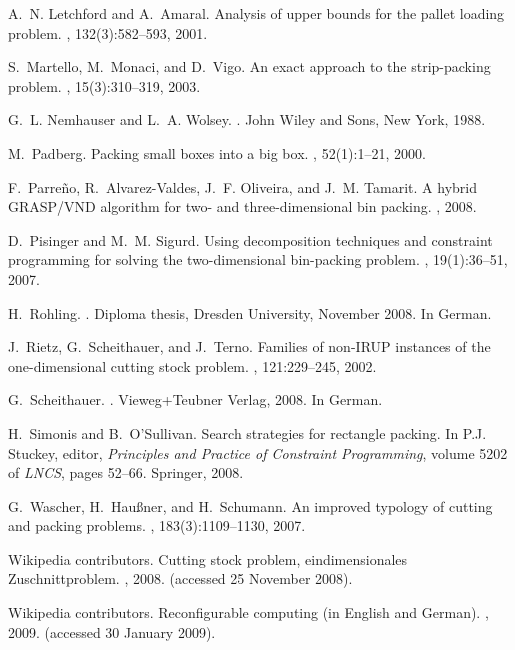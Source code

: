 \documentclass[a4paper,12pt]{article}
\begin{document}
\begin{thebibliography}{10}
A.~N. Letchford and A.~Amaral.
\newblock Analysis of upper bounds for the pallet loading problem.
, 132(3):582--593,
  2001.

S.~Martello, M.~Monaci, and D.~Vigo.
\newblock An exact approach to the strip-packing problem.
, 15(3):310--319, 2003.

G.~L. Nemhauser and L.~A. Wolsey.
.
\newblock John Wiley and Sons, New York, 1988.

M.~Padberg.
\newblock Packing small boxes into a big box.
, 52(1):1--21, 2000.

F.~Parre{\~n}o, R.~Alvarez-Valdes, J.~F. Oliveira, and J.~M. Tamarit.
\newblock A hybrid {GRASP/VND} algorithm for two- and three-dimensional bin
  packing.
, 2008.

D.~Pisinger and M.~M. Sigurd.
\newblock Using decomposition techniques and constraint programming for solving
  the two-dimensional bin-packing problem.
, 19(1):36--51, 2007.

H.~Rohling.
.
\newblock Diploma thesis, Dresden University, November 2008.
\newblock In German.

J.~Rietz, G.~Scheithauer, and J.~Terno.
\newblock Families of non-{IRUP} instances of the one-dimensional cutting stock
  problem.
, 121:229--245, 2002.

G.~Scheithauer.
.
\newblock Vieweg+Teubner Verlag, 2008.
\newblock In German.

H.~Simonis and B.~O'Sullivan.
\newblock Search strategies for rectangle packing.
\newblock In P.J. Stuckey, editor, {\em Principles and Practice of Constraint
  Programming}, volume 5202 of {\em LNCS}, pages 52--66. Springer, 2008.

G.~Wascher, H.~Hau{\ss}ner, and H.~Schumann.
\newblock An improved typology of cutting and packing problems.
, 183(3):1109--1130,
  2007.

{Wikipedia contributors}.
\newblock Cutting stock problem, eindimensionales {Z}uschnittproblem.
, 2008.
\newblock (accessed 25 November 2008).

{Wikipedia contributors}.
\newblock Reconfigurable computing (in {E}nglish and {G}erman).
, 2009.
\newblock (accessed 30 January 2009).

\end{thebibliography}
\end{document}
